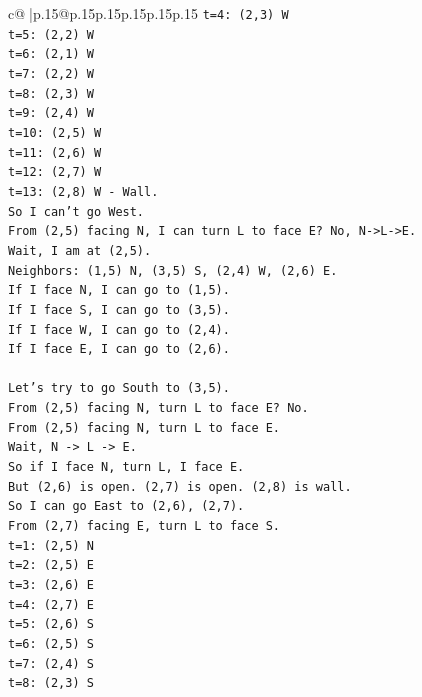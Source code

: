 \documentclass{article}
\begin{document}
{\begin{supertabular}{c@{$\;$}|p{.15\linewidth}@{}p{.15\linewidth}p{.15\linewidth}p{.15\linewidth}p{.15\linewidth}p{.15\linewidth}}
{{{\texttt{t=4: (2,3) W} \\
\texttt{t=5: (2,2) W} \\
\texttt{t=6: (2,1) W} \\
\texttt{t=7: (2,2) W} \\
\texttt{t=8: (2,3) W} \\
\texttt{t=9: (2,4) W} \\
\texttt{t=10: (2,5) W} \\
\texttt{t=11: (2,6) W} \\
\texttt{t=12: (2,7) W} \\
\texttt{t=13: (2,8) W {-} Wall.} \\
\texttt{So I can't go West.} \\
\texttt{From (2,5) facing N, I can turn L to face E? No, N{-}>L{-}>E.} \\
\texttt{Wait, I am at (2,5).} \\
\texttt{Neighbors: (1,5) N, (3,5) S, (2,4) W, (2,6) E.} \\
\texttt{If I face N, I can go to (1,5).} \\
\texttt{If I face S, I can go to (3,5).} \\
\texttt{If I face W, I can go to (2,4).} \\
\texttt{If I face E, I can go to (2,6).} \\
\\ 
\texttt{Let's try to go South to (3,5).} \\
\texttt{From (2,5) facing N, turn L to face E? No.} \\
\texttt{From (2,5) facing N, turn L to face E.} \\
\texttt{Wait, N {-}> L {-}> E.} \\
\texttt{So if I face N, turn L, I face E.} \\
\texttt{But (2,6) is open. (2,7) is open. (2,8) is wall.} \\
\texttt{So I can go East to (2,6), (2,7).} \\
\texttt{From (2,7) facing E, turn L to face S.} \\
\texttt{t=1: (2,5) N} \\
\texttt{t=2: (2,5) E} \\
\texttt{t=3: (2,6) E} \\
\texttt{t=4: (2,7) E} \\
\texttt{t=5: (2,6) S} \\
\texttt{t=6: (2,5) S} \\
\texttt{t=7: (2,4) S} \\
\texttt{t=8: (2,3) S} \\
}}}
\end{supertabular}}
\end{document}

